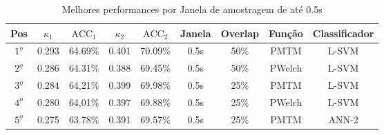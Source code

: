 \begin{table}[h!]
	\centering
	\caption{Melhores performances por Janela de amostragem de at\'e 0.5s}
	\begin{tabularx}{\textwidth}{c|c|c|c|c|c|c|c|c}		
		\hline\hline
		Pos&$\kappa_1$ &$\text{ACC}_1$&$\kappa_2$&$\text{ACC}_2$&Janela& Overlap&Fun\c{c}\~ao&Classificador  \\ \hline
		$1^{\underline{o}}$&0.293&64.69\%&0.401&70.09\%&0.5s&	50\%&PMTM&L-SVM \\ \hline 
		$2^{\underline{o}}$&0.286&64.31\%&0.388&69.45\%&0.5s&	50\%&PWelch&L-SVM \\ \hline
		$3^{\underline{o}}$&0.284&64,21\%&0.399&69.98\%&0.5s&25\%&PMTM&L-SVM \\ \hline
		$4^{\underline{o}}$&0.280&64,01\%&0.397&69.88\%&0.5s&25\%&PWelch&L-SVM \\ \hline
		$5^{\underline{o}}$&0.275&63.78\%&0.391&69.57\%&0.5s&	25\%&PMTM&ANN-2 \\ \hline
	\end{tabularx}
	\label{Tab:melhoresKappa125}
\end{table}
